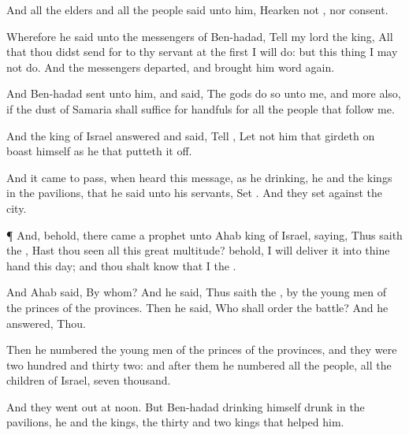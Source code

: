 {And all the
elders and all the
people
said unto him,
Hearken not
{}, nor
consent.

Wherefore he
said unto the
messengers of
Ben-hadad,
Tell my
lord the
king, All that thou didst
send for to thy
servant at the
first I will
do: but this
thing I
may not
do. And the
messengers
departed, and
brought him
word
again.

And
Ben-hadad
sent unto him, and
said, The
gods do
so unto me, and more
also, if the
dust of
Samaria shall
suffice for
handfuls for all the
people that
follow me.

And the
king of
Israel
answered and
said,
Tell
{}, Let not him that
girdeth on
{}
boast himself as he that putteth it
off.


\par }{\PP {}And it came to pass, when
{}
heard this
message, as he
{}
drinking, he and the
kings in the
pavilions, that he
said unto his
servants,
Set
{}. And they
set
{} against the
city.


\par }{\PP {}¶ And, behold, there
came
a
prophet unto
Ahab
king of
Israel,
saying, Thus
saith the
{}, Hast thou
seen all this
great
multitude? behold, I will
deliver it into thine
hand this
day; and thou shalt
know that I
{} the
{}.

And
Ahab
said, By whom? And he
said, Thus
saith the
{},
{} by the young
men of the
princes of the
provinces. Then he
said, Who shall
order the
battle? And he
answered, Thou.

Then he
numbered the young
men of the
princes of the
provinces, and they were
two
hundred and
thirty
two: and
after them he
numbered all the
people,
{} all the
children of
Israel,
{}
seven
thousand.

And they went
out at
noon. But
Ben-hadad
{}
drinking himself
drunk in the
pavilions, he and the
kings, the
thirty and
two
kings that
helped him.

}
